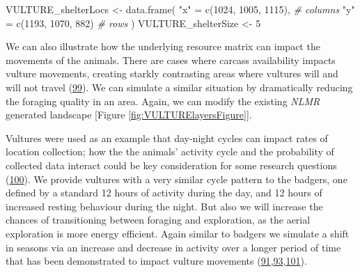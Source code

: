 \documentclass[10pt,a4paper]{article}
\newenvironment{Shaded}{}{}
\newcommand{\CommentTok}[1]{\textit{#1}}
\newcommand{\DecValTok}[1]{#1}
\newcommand{\FloatTok}[1]{#1}
\newcommand{\FunctionTok}[1]{#1}
\newcommand{\NormalTok}[1]{#1}
\newcommand{\OtherTok}[1]{#1}
\newcommand{\SpecialCharTok}[1]{#1}
\newcommand{\StringTok}[1]{#1}
\begin{document}
\begin{Shaded}
\begin{Highlighting}[]
\NormalTok{VULTURE\_shelterLocs }\OtherTok{\textless{}{-}} \FunctionTok{data.frame}\NormalTok{(}
  \StringTok{"x"} \OtherTok{=} \FunctionTok{c}\NormalTok{(}\DecValTok{1024}\NormalTok{, }\DecValTok{1005}\NormalTok{, }\DecValTok{1115}\NormalTok{), }\CommentTok{\# columns}
  \StringTok{"y"} \OtherTok{=} \FunctionTok{c}\NormalTok{(}\DecValTok{1193}\NormalTok{, }\DecValTok{1070}\NormalTok{, }\DecValTok{882}\NormalTok{) }\CommentTok{\# rows}
\NormalTok{)}
\NormalTok{VULTURE\_shelterSize }\OtherTok{\textless{}{-}} \DecValTok{5}
\end{Highlighting}
\end{Shaded}

We can also illustrate how the underlying resource matrix can impact the movements of the animals.
There are cases where carcass availability impacts vulture movements, creating starkly contrasting areas where vultures will and will not travel (\protect\hyperlink{ref-arrondo_invisible_2018}{99}).
We can simulate a similar situation by dramatically reducing the foraging quality in an area.
Again, we can modify the existing \emph{NLMR} generated landscape {[}Figure \ref{fig:VULTURElayersFigure}{]}.

\begin{Shaded}
\end{Shaded}

Vultures were used as an example that day-night cycles can impact rates of location collection; how the the animals' activity cycle and the probability of collected data interact could be key consideration for some research questions (\protect\hyperlink{ref-silva_seasonal_2017}{100}).
We provide vultures with a very similar cycle pattern to the badgers, one defined by a standard 12 hours of activity during the day, and 12 hours of increased resting behaviour during the night.
But also we will increase the chances of transitioning between foraging and exploration, as the aerial exploration is more energy efficient.
Again similar to badgers we simulate a shift in seasons via an increase and decrease in activity over a longer period of time that has been demonstrated to impact vulture movements (\protect\hyperlink{ref-hribsek_first_2021}{91},\protect\hyperlink{ref-garcia-jimenez_drivers_2018}{93},\protect\hyperlink{ref-peshev_new_2021}{101}).
\end{document}
